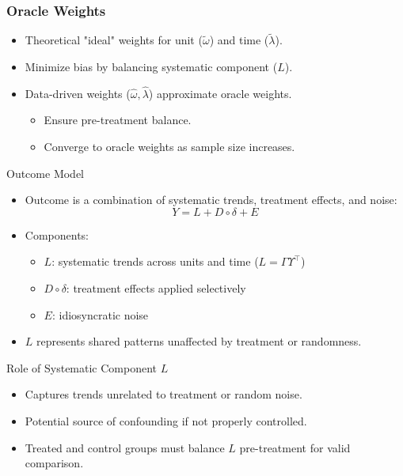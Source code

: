 \documentclass{beamer}
\begin{document}
\begin{frame}
\frametitle{Oracle Weights}

\begin{itemize}
    \item Theoretical "ideal" weights for unit (\(\tilde{\omega}\)) and time (\(\tilde{\lambda}\)).
    \item Minimize bias by balancing systematic component (\(L\)).
    \item Data-driven weights (\(\hat{\omega}, \hat{\lambda}\)) approximate oracle weights.
        \begin{itemize}
            \item Ensure pre-treatment balance.
            \item Converge to oracle weights as sample size increases.
        \end{itemize}
\end{itemize}

\end{frame}



\begin{frame}{Outcome Model}
\begin{itemize}
\item Outcome is a combination of systematic trends, treatment effects, and noise:
\[
Y = L + D \circ \delta + E
\]
\item Components:
    \begin{itemize}
    \item \(L\): systematic trends across units and time (\(L = \Gamma \Upsilon^\top\))
    \item \(D \circ \delta\): treatment effects applied selectively
    \item \(E\): idiosyncratic noise
    \end{itemize}
\item \(L\) represents shared patterns unaffected by treatment or randomness.
\end{itemize}
\end{frame}

\begin{frame}{Role of Systematic Component \(L\)}
\begin{itemize}
\item Captures trends unrelated to treatment or random noise.
\item Potential source of confounding if not properly controlled.
\item Treated and control groups must balance \(L\) pre-treatment for valid comparison.
\end{itemize}
\end{frame}
\end{document}

